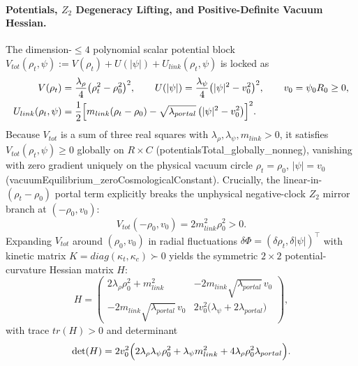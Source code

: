 \documentclass[american,11pt,letterpaper]{article}
\def\mathbb#1{#1}%
\def\mathrm#1{#1}%
\def\texttt#1{#1}%
\begin{document}
\paragraph{Potentials, $\mathbb{Z}_2$ Degeneracy Lifting, and Positive-Definite Vacuum Hessian.}
The dimension-$\le 4$ polynomial scalar potential block $V_{\mathrm{tot}}(\rho_t,\psi) := V(\rho_t) + U(|\psi|) + U_{\mathrm{link}}(\rho_t,\psi)$ is locked as
\begin{align}
V(\rho_t) &= \frac{\lambda_\rho}{4}\bigl(\rho_t^2 - \rho_0^2\bigr)^2,
\qquad
U(|\psi|) = \frac{\lambda_\psi}{4}\bigl(|\psi|^2 - v_0^2\bigr)^2,
\qquad v_0 = \psi_0 R_0 \ge 0, \label{eq:V_U_canonical}\\
U_{\mathrm{link}}(\rho_t,\psi) &= \frac{1}{2}\Bigl[m_{\mathrm{link}}(\rho_t - \rho_0) - \sqrt{\lambda_{\mathrm{portal}}}\,\bigl(|\psi|^2 - v_0^2\bigr)\Bigr]^2.
\label{eq:U_link_canonical}
\end{align}
Because $V_{\mathrm{tot}}$ is a sum of three real squares with $\lambda_\rho, \lambda_\psi, m_{\mathrm{link}} > 0$, it satisfies $V_{\mathrm{tot}}(\rho_t,\psi) \ge 0$ globally on $\mathbb{R}\times\mathbb{C}$ (\texttt{potentialsTotal\_globally\_nonneg}), vanishing with zero gradient uniquely on the physical vacuum circle $\rho_t = \rho_0$, $|\psi| = v_0$ (\texttt{vacuumEquilibrium\_zeroCosmologicalConstant}). Crucially, the linear-in-$(\rho_t - \rho_0)$ portal term explicitly breaks the unphysical negative-clock $\mathbb{Z}_2$ mirror branch at $(-\rho_0, v_0)$:
\begin{equation}
V_{\mathrm{tot}}(-\rho_0, v_0) = 2 m_{\mathrm{link}}^2 \rho_0^2 > 0.
\label{eq:Z2_lifting_gap}
\end{equation}
Expanding $V_{\mathrm{tot}}$ around $(\rho_0, v_0)$ in radial fluctuations $\delta\Phi = (\delta\rho_t, \delta|\psi|)^\top$ with kinetic matrix $K = \mathrm{diag}(\kappa_t, \kappa_c) \succ 0$ yields the symmetric $2\times 2$ potential-curvature Hessian matrix $H$:
\begin{equation}
H = \begin{pmatrix}
2\lambda_\rho\rho_0^2 + m_{\mathrm{link}}^2 & -2 m_{\mathrm{link}}\sqrt{\lambda_{\mathrm{portal}}}\,v_0 \\[0.4em]
-2 m_{\mathrm{link}}\sqrt{\lambda_{\mathrm{portal}}}\,v_0 & 2 v_0^2\bigl(\lambda_\psi + 2\lambda_{\mathrm{portal}}\bigr)
\end{pmatrix},
\label{eq:radial_Hessian_sec5}
\end{equation}
with trace $\mathrm{tr}(H) > 0$ and determinant
\begin{equation}
\det(H) = 2 v_0^2\Bigl(2\lambda_\rho\lambda_\psi\rho_0^2 + \lambda_\psi m_{\mathrm{link}}^2 + 4\lambda_\rho\rho_0^2\lambda_{\mathrm{portal}}\Bigr).
\label{eq:det_H_positive}
\end{equation}
\end{document}
